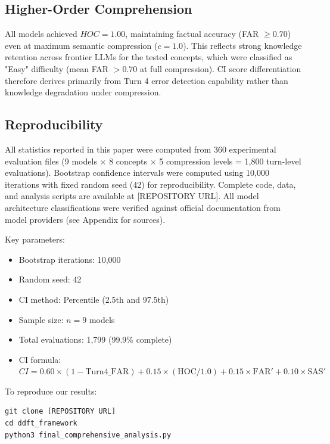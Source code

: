 \subsection{Higher-Order Comprehension}

All models achieved $HOC = 1.00$, maintaining factual accuracy (FAR $\geq 0.70$)
even at maximum semantic compression ($c = 1.0$). This reflects strong knowledge
retention across frontier LLMs for the tested concepts, which were classified as
"Easy" difficulty (mean FAR $> 0.70$ at full compression). CI score differentiation
therefore derives primarily from Turn 4 error detection capability rather than
knowledge degradation under compression.


\subsection{Reproducibility}

All statistics reported in this paper were computed from 360 experimental evaluation
files (9 models $\times$ 8 concepts $\times$ 5 compression levels = 1,800 turn-level
evaluations). Bootstrap confidence intervals were computed using 10,000 iterations
with fixed random seed (42) for reproducibility. Complete code, data, and analysis
scripts are available at [REPOSITORY URL]. All model architecture classifications
were verified against official documentation from model providers (see Appendix
for sources).

Key parameters:
\begin{itemize}
\item Bootstrap iterations: 10,000
\item Random seed: 42
\item CI method: Percentile (2.5th and 97.5th)
\item Sample size: $n = 9$ models
\item Total evaluations: 1,799 (99.9\% complete)
\item CI formula: $CI = 0.60 \times (1 - \text{Turn4\_FAR}) + 0.15 \times (\text{HOC}/1.0) + 0.15 \times \text{FAR}' + 0.10 \times \text{SAS}'$
\end{itemize}

To reproduce our results:
\begin{verbatim}
git clone [REPOSITORY URL]
cd ddft_framework
python3 final_comprehensive_analysis.py
\end{verbatim}

